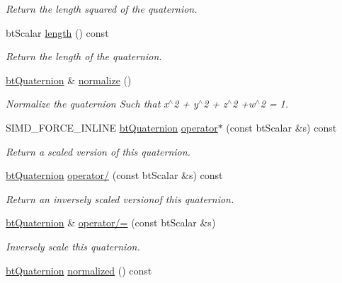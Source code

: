 \begin{CompactItemize}
\begin{CompactList}\small\item\em Return the length squared of the quaternion. \item\end{CompactList}\item 
\hypertarget{classbt_quaternion_9041c1885648f81009f41fc2aa6c17df}{
btScalar \hyperlink{classbt_quaternion_9041c1885648f81009f41fc2aa6c17df}{length} () const }
\label{classbt_quaternion_9041c1885648f81009f41fc2aa6c17df}

\begin{CompactList}\small\item\em Return the length of the quaternion. \item\end{CompactList}\item 
\hypertarget{classbt_quaternion_db5cd1eb8145a906f9f47857c498d3d6}{
\hyperlink{classbt_quaternion}{btQuaternion} \& \hyperlink{classbt_quaternion_db5cd1eb8145a906f9f47857c498d3d6}{normalize} ()}
\label{classbt_quaternion_db5cd1eb8145a906f9f47857c498d3d6}

\begin{CompactList}\small\item\em Normalize the quaternion Such that x$^\wedge$2 + y$^\wedge$2 + z$^\wedge$2 +w$^\wedge$2 = 1. \item\end{CompactList}\item 
SIMD\_\-FORCE\_\-INLINE \hyperlink{classbt_quaternion}{btQuaternion} \hyperlink{classbt_quaternion_cc3942c106bc598c0d4550d30128a7d1}{operator$\ast$} (const btScalar \&s) const 
\begin{CompactList}\small\item\em Return a scaled version of this quaternion. \item\end{CompactList}\item 
\hyperlink{classbt_quaternion}{btQuaternion} \hyperlink{classbt_quaternion_4208a1ae41ae01d4dfa0d25792441213}{operator/} (const btScalar \&s) const 
\begin{CompactList}\small\item\em Return an inversely scaled versionof this quaternion. \item\end{CompactList}\item 
\hyperlink{classbt_quaternion}{btQuaternion} \& \hyperlink{classbt_quaternion_294fe99e7e5a8e0d45d111334e2e1552}{operator/=} (const btScalar \&s)
\begin{CompactList}\small\item\em Inversely scale this quaternion. \item\end{CompactList}\item 
\hypertarget{classbt_quaternion_b74af1c81fd04a63c1697b25a063e507}{
\hyperlink{classbt_quaternion}{btQuaternion} \hyperlink{classbt_quaternion_b74af1c81fd04a63c1697b25a063e507}{normalized} () const }
\label{classbt_quaternion_b74af1c81fd04a63c1697b25a063e507}


\end{CompactItemize}
